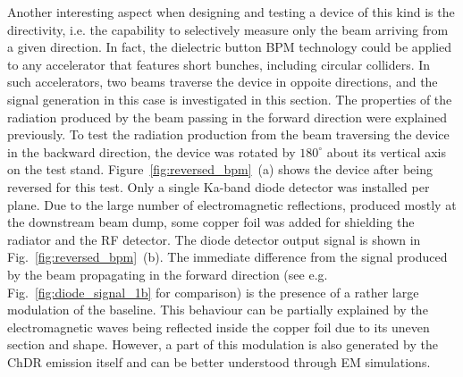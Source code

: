Another interesting aspect when designing and testing a device of this kind is the directivity, i.e. the capability to selectively measure only the beam arriving from a given direction. In fact, the dielectric button BPM technology could be applied to any accelerator that features short bunches, including circular colliders. In such accelerators, two beams traverse the device in oppoite directions, and the signal generation in this case is investigated in this section.  The properties of the radiation produced by the beam passing in the forward direction were explained previously. To test the radiation production from the beam traversing the device in the backward direction, the device was rotated by $180^\circ$ about its vertical axis on the test stand. Figure~\ref{fig:reversed_bpm}~(a) shows the device after being reversed for this test. Only a single Ka-band diode detector was installed per plane. Due to the large number of electromagnetic reflections, produced mostly at the downstream beam dump, some copper foil was added for shielding the radiator and the RF detector. The diode detector output signal is shown in Fig.~\ref{fig:reversed_bpm}~(b). The immediate difference from the signal produced by the beam propagating in the forward direction (see e.g. Fig.~\ref{fig:diode_signal_1b} for comparison) is the presence of a rather large modulation of the baseline. This behaviour can be partially explained by the electromagnetic waves being reflected inside the copper foil due to its uneven section and shape. However, a part of this modulation is also generated by the ChDR emission itself and can be better understood through EM simulations. 









